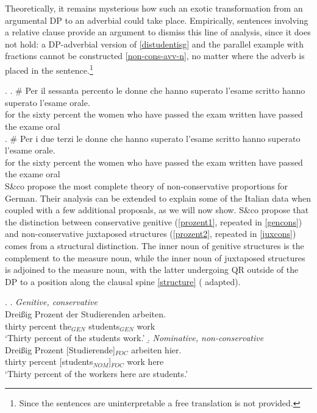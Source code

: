 \documentclass[charis, linguex]{glossa}
\begin{document}
Theoretically, it remains mysterious how such an exotic transformation from an argumental DP to an adverbial could take place. Empirically, sentences involving a relative clause provide an argument to dismiss this line of analysis, since it does not hold: a DP-adverbial version of \ref{distudentisg} and the parallel example with fractions cannot be constructed \ref{non-cons-avv-n}, no matter where the adverb is placed in the sentence.\footnote{Since the sentences are uninterpretable a free translation is not provided.}

\ex. \label{non-cons-avv-n}	   \ag. \# Per il sessanta percento le donne che hanno superato l'esame scritto hanno superato l'esame orale. \\
      for the sixty percent the women who have passed {the exam} written have passed {the exame} oral  \\ 
	   \bg. \# Per i due terzi le donne che hanno superato l'esame scritto hanno superato l'esame orale. \\
       for the sixty percent the women who have passed {the exam} written have passed {the exame} oral \\ 

		 
		 		  
S\&co propose the most complete theory of non-conservative proportions for German. Their analysis can be extended to explain some of the Italian data when coupled with a few additional proposals, as we will now show. S\&co propose that the distinction between conservative genitive (\ref{prozent1}, repeated in \ref{gencons}) and non-conservative juxtaposed structures (\ref{prozent2}, repeated in \ref{juxcons}) comes from a structural distinction. The inner noun of genitive structures is the complement to the measure noun, while the inner noun of juxtaposed structures is adjoined to the measure noun, with the latter undergoing QR outside of the DP to a position along the clausal spine \ref{structure} (\citealt[ex.40]{pas22} adapted). 

\ex. \a. \textit{Genitive, conservative} \\
        \gll  Dreißig Prozent der Studierenden arbeiten. \\ 
          thirty percent the$_{GEN}$ students$_{GEN}$ work \\
        \glt  `Thirty percent of the students work.'  \label{gencons}
     \b.  \textit{Nominative, non-conservative} \\
	    \gll Dreißig Prozent [Studierende]$_{FOC}$ arbeiten hier. \\
          thirty percent [students$_{NOM}$]$_{FOC}$ work here \\
        \glt `Thirty percent of the workers here are students.' \label{juxcons}
\end{document}
